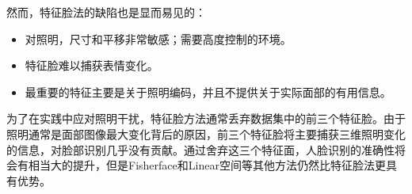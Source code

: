 \documentclass[UTF8]{ctexart}
\begin{document}
然而，特征脸法的缺陷也是显而易见的：
\begin{itemize}
	\item 对照明，尺寸和平移非常敏感；需要高度控制的环境。
	\item 特征脸难以捕获表情变化。
	\item 最重要的特征主要是关于照明编码，并且不提供关于实际面部的有用信息。
\end{itemize}
为了在实践中应对照明干扰，特征脸方法通常丢弃数据集中的前三个特征脸。由于照明通常是面部图像最大变化背后的原因，前三个特征脸将主要捕获三维照明变化的信息，对脸部识别几乎没有贡献。通过舍弃这三个特征面，人脸识别的准确性将会有相当大的提升，但是Fisherface和Linear空间等其他方法仍然比特征脸法更具有优势。



\end{document}

